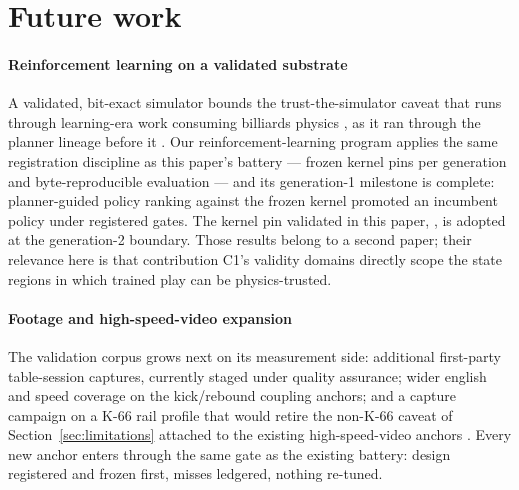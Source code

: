 \section{Future work}
\label{sec:future}

\paragraph{Reinforcement learning on a validated substrate}
A validated, bit-exact simulator bounds the trust-the-simulator caveat
that runs through learning-era work consuming billiards physics
\citep{fragkiadaki2016learning,xu2025deepphy,memery2025cuetip}, as it ran
through the planner lineage before it
\citep{smith2007pickpocket,archibald2016distributed}. Our
reinforcement-learning program applies the same registration discipline
as this paper's battery --- frozen kernel pins per generation and
byte-reproducible evaluation --- and its generation-1 milestone is
complete: planner-guided policy ranking against the frozen kernel
promoted an incumbent policy under registered gates. The kernel pin
validated in this paper, , is adopted at the
generation-2 boundary. Those results belong to a second paper; their
relevance here is that contribution C1's validity domains directly scope
the state regions in which trained play can be physics-trusted.

\paragraph{Footage and high-speed-video expansion}
The validation corpus grows next on its measurement side: additional
first-party table-session captures, currently staged under quality
assurance; wider english and speed coverage on the kick/rebound coupling
anchors; and a capture campaign on a K-66 rail profile that would retire
the non-K-66 caveat of Section~\ref{sec:limitations} attached to the
existing high-speed-video anchors \citep{alciatore_hsv_catalog}. Every
new anchor enters through the same gate as the existing battery: design
registered and frozen first, misses ledgered, nothing re-tuned.

